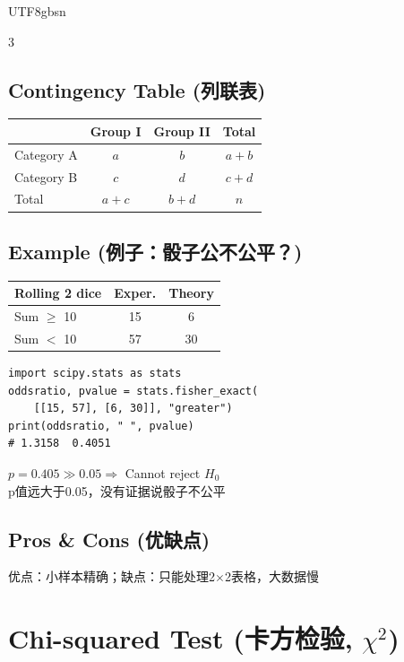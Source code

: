 \documentclass[10pt,landscape,a4paper]{article}
\newcommand{\zhint}[1]{{\scriptsize\color{gray!70!black}#1}}
\begin{document}
\begin{CJK}{UTF8}{gbsn}
\begin{multicols}{3}
\subsection{Contingency Table \zhint{(列联表)}}
\begin{center}
\begin{tabular}{l|cc|c}
\toprule
 & Group I & Group II & Total \\
\midrule
Category A & $a$ & $b$ & $a+b$ \\
Category B & $c$ & $d$ & $c+d$ \\
\midrule
Total & $a+c$ & $b+d$ & $n$ \\
\bottomrule
\end{tabular}
\end{center}

\subsection{Example \zhint{(例子：骰子公不公平？)}}
\begin{center}
\begin{tabular}{l|cc}
\toprule
Rolling 2 dice & Exper. & Theory \\
\midrule
Sum $\geq$ 10 & 15 & 6 \\
Sum $<$ 10 & 57 & 30 \\
\bottomrule
\end{tabular}
\end{center}

\begin{lstlisting}
import scipy.stats as stats
oddsratio, pvalue = stats.fisher_exact(
    [[15, 57], [6, 30]], "greater")
print(oddsratio, " ", pvalue)
# 1.3158  0.4051
\end{lstlisting}
$p = 0.405 \gg 0.05 \Rightarrow$ Cannot reject $H_0$\\
\zhint{p值远大于0.05，没有证据说骰子不公平}

\subsection{Pros \& Cons \zhint{(优缺点)}}
\zhint{优点：小样本精确；缺点：只能处理2$\times$2表格，大数据慢}

\section{Chi-squared Test \zhint{(卡方检验, $\chi^2$)}}


\end{multicols}
\end{CJK}
\end{document}
